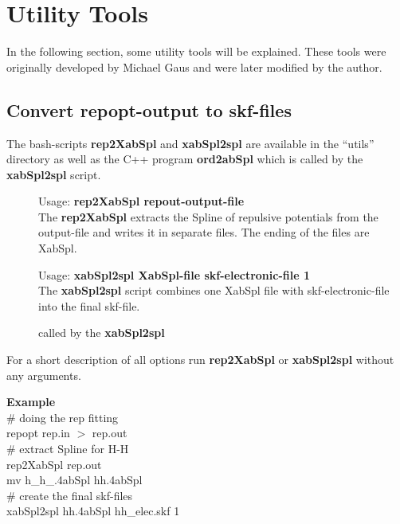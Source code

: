 \chapter{Utility Tools}

In the following section, some utility tools will be explained. These
tools were originally developed by Michael Gaus and were later modified by
the author.

\section{Convert \textbf{repopt}-output to skf-files}

The bash-scripts \textbf{rep2XabSpl} and \textbf{xabSpl2spl} are available
in the ``utils'' directory as well as the C++ program \textbf{ord2abSpl}
which is called by the \textbf{xabSpl2spl} script. 

\begin{description}
  \item[] Usage: \textbf{rep2XabSpl repout-output-file} \\
                         The \textbf{rep2XabSpl} extracts the Spline of 
                         repulsive potentials from the output-file and
                         writes it in separate files. The ending of
                         the files are XabSpl. 
  \item[] Usage: \textbf{xabSpl2spl XabSpl-file skf-electronic-file 1}\\ 
                         The \textbf{xabSpl2spl} script combines one XabSpl
                         file with skf-electronic-file into the final skf-file.  
  \item[] called by the \textbf{xabSpl2spl} 
\end{description} 

For a short description of all options run \textbf{rep2XabSpl} or
\textbf{xabSpl2spl} without any arguments.

\textbf{Example}\\ 
{\scriptsize
\noindent\# doing the rep fitting\\
repopt rep.in $>$ rep.out \\

\noindent\# extract Spline for H-H\\
rep2XabSpl rep.out \\
mv h\_h\_.4abSpl hh.4abSpl \\

\noindent\# create the final skf-files \\
xabSpl2spl hh.4abSpl hh\_elec.skf  1 \\
} 

